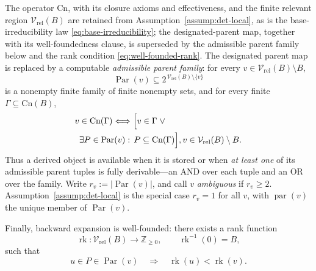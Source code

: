 \documentclass[10pt,a4paper]{amsart}
\newcommand{\Cn}{\text{Cn}}
\begin{document}
\begin{assumption}
\label{assump:and-or-local}
The operator \(\Cn\), with its closure axioms and effectiveness, and the
finite relevant region \(\mathcal V_{\mathrm{rel}}(B)\) are retained from
Assumption~\ref{assump:det-local}, as is the base-irreducibility law
\eqref{eq:base-irreducibility}; the designated-parent map, together with its
well-foundedness clause, is superseded by the admissible parent family below
and the rank condition \eqref{eq:well-founded-rank}.  The designated parent
map is replaced by a computable \emph{admissible parent family}: for every
\(v\in\mathcal V_{\mathrm{rel}}(B)\setminus B\),
\[
  \operatorname{Par}(v)
  \subseteq
  2^{\,\mathcal V_{\mathrm{rel}}(B)\setminus\{v\}}
\]
is a nonempty finite family of finite nonempty sets, and for every finite
\(\Gamma\subseteq\Cn(B)\),
\begin{equation}
  \begin{split}
    v & \in\Cn(\Gamma)
    \Longleftrightarrow
    \Bigl[ v\in\Gamma \;\lor \\
       & \exists P\in\operatorname{Par}(v):\, P\subseteq\Cn(\Gamma) \Bigr],
     v\in\mathcal V_{\mathrm{rel}}(B)\setminus B.
  \end{split}
\label{eq:and-or-local-law}
\end{equation}
Thus a derived object is available when it is stored or when \emph{at least
one} of its admissible parent tuples is fully derivable---an AND over each
tuple and an OR over the family.  Write \(r_v:=|\operatorname{Par}(v)|\),
and call \(v\) \emph{ambiguous} if \(r_v\ge 2\).
Assumption~\ref{assump:det-local} is the special case \(r_v=1\) for all
\(v\), with \(\operatorname{par}(v)\) the unique member of
\(\operatorname{Par}(v)\).

Finally, backward expansion is well-founded: there exists a rank function
\[
  \operatorname{rk}:\mathcal V_{\mathrm{rel}}(B)\longrightarrow\mathbb Z_{\ge0},
  \qquad
  \operatorname{rk}^{-1}(0)=B,
\]
such that
\begin{equation}
  u\in P\in\operatorname{Par}(v)
  \quad\Longrightarrow\quad
  \operatorname{rk}(u)<\operatorname{rk}(v).
\label{eq:well-founded-rank}
\end{equation}
\end{assumption}
\end{document}
